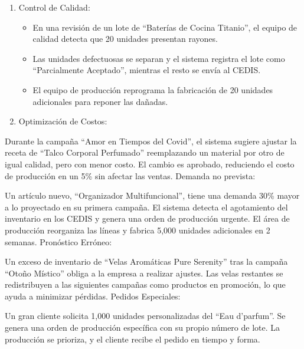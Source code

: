 \documentclass[
  letterpaper,
  DIV=11,
  numbers=noendperiod]{scrreprt}
\providecommand{\tightlist}{%
  \setlength{\itemsep}{0pt}\setlength{\parskip}{0pt}}\usepackage{longtable,booktabs,array}
\begin{document}
\begin{enumerate}
\def\labelenumi{\arabic{enumi}.}
\setcounter{enumi}{2}
\tightlist
\item
  Control de Calidad:

  \begin{itemize}
  \tightlist
  \item
    En una revisión de un lote de ``Baterías de Cocina Titanio'', el
    equipo de calidad detecta que 20 unidades presentan rayones.
  \item
    Las unidades defectuosas se separan y el sistema registra el lote
    como ``Parcialmente Aceptado'', mientras el resto se envía al CEDIS.
  \item
    El equipo de producción reprograma la fabricación de 20 unidades
    adicionales para reponer las dañadas.
  \end{itemize}
\item
  Optimización de Costos:
\end{enumerate}

Durante la campaña ``Amor en Tiempos del Covid'', el sistema sugiere
ajustar la receta de ``Talco Corporal Perfumado'' reemplazando un
material por otro de igual calidad, pero con menor costo. El cambio es
aprobado, reduciendo el costo de producción en un 5\% sin afectar las
ventas. Demanda no prevista:

Un artículo nuevo, ``Organizador Multifuncional'', tiene una demanda
30\% mayor a lo proyectado en su primera campaña. El sistema detecta el
agotamiento del inventario en los CEDIS y genera una orden de producción
urgente. El área de producción reorganiza las líneas y fabrica 5,000
unidades adicionales en 2 semanas. Pronóstico Erróneo:

Un exceso de inventario de ``Velas Aromáticas Pure Serenity'' tras la
campaña ``Otoño Místico'' obliga a la empresa a realizar ajustes. Las
velas restantes se redistribuyen a las siguientes campañas como
productos en promoción, lo que ayuda a minimizar pérdidas. Pedidos
Especiales:

Un gran cliente solicita 1,000 unidades personalizadas del ``Eau
d'parfum''. Se genera una orden de producción específica con su propio
número de lote. La producción se prioriza, y el cliente recibe el pedido
en tiempo y forma.
\end{document}
